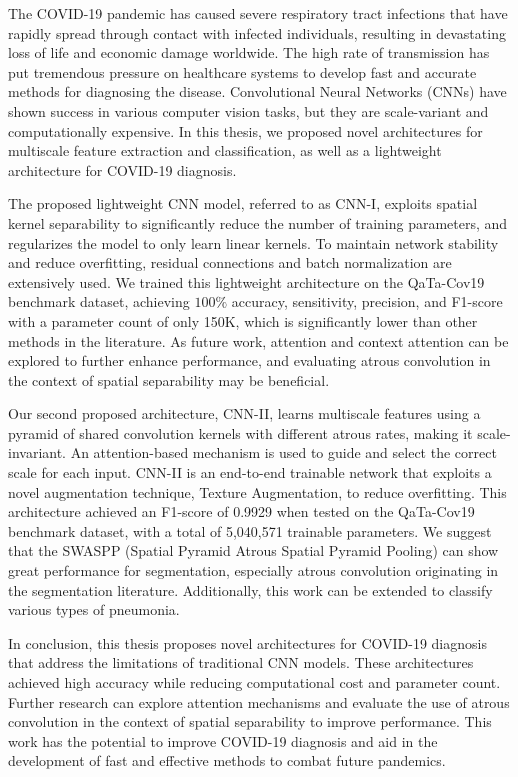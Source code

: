 The COVID-19 pandemic has caused severe respiratory tract infections that have rapidly spread through contact with infected individuals, resulting in devastating loss of life and economic damage worldwide. The high rate of transmission has put tremendous pressure on healthcare systems to develop fast and accurate methods for diagnosing the disease. Convolutional Neural Networks (CNNs) have shown success in various computer vision tasks, but they are scale-variant and computationally expensive. In this thesis, we proposed novel architectures for multiscale feature extraction and classification, as well as a lightweight architecture for COVID-19 diagnosis.

The proposed lightweight CNN model, referred to as CNN-I, exploits spatial kernel separability to significantly reduce the number of training parameters, and regularizes the model to only learn linear kernels. To maintain network stability and reduce overfitting, residual connections and batch normalization are extensively used. We trained this lightweight architecture on the QaTa-Cov19 benchmark dataset, achieving $100\%$ accuracy, sensitivity, precision, and F1-score with a parameter count of only 150K, which is significantly lower than other methods in the literature. As future work, attention and context attention can be explored to further enhance performance, and evaluating atrous convolution in the context of spatial separability may be beneficial.

Our second proposed architecture, CNN-II, learns multiscale features using a pyramid of shared convolution kernels with different atrous rates, making it scale-invariant. An attention-based mechanism is used to guide and select the correct scale for each input. CNN-II is an end-to-end trainable network that exploits a novel augmentation technique, Texture Augmentation, to reduce overfitting. This architecture achieved an F1-score of 0.9929 when tested on the QaTa-Cov19 benchmark dataset, with a total of 5,040,571 trainable parameters. We suggest that the SWASPP (Spatial Pyramid Atrous Spatial Pyramid Pooling) can show great performance for segmentation, especially atrous convolution originating in the segmentation literature. Additionally, this work can be extended to classify various types of pneumonia.

In conclusion, this thesis proposes novel architectures for COVID-19 diagnosis that address the limitations of traditional CNN models. These architectures achieved high accuracy while reducing computational cost and parameter count. Further research can explore attention mechanisms and evaluate the use of atrous convolution in the context of spatial separability to improve performance. This work has the potential to improve COVID-19 diagnosis and aid in the development of fast and effective methods to combat future pandemics.

